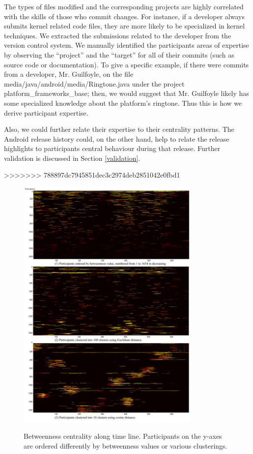 \documentclass[conference]{IEEEtran}
\begin{document}
The types of files modified and the corresponding projects are highly
correlated with the skills of those who commit changes. For
instance, if a developer always submits kernel related code
files, they are more likely to be specialized in kernel techniques. We
extracted the submissions related to the developer from the version
control system.
We manually identified the participants areas of expertise by
observing the ``project'' and the
``target'' for all of their commits (such as source code or
documentation).
To give a specific example, if there were commits from a developer,
Mr. Guilfoyle, on the file
media/java/android/media/Ringtone.java under the project
platform\_frameworks\_base; then, we would suggest that Mr. Guilfoyle 
likely has some specialized knowledge about the platform's ringtone. 
Thus this is how we derive participant expertise.

Also, we could further relate their expertise to their centrality
patterns. The Android release history could, on the other hand, help
to relate the release highlights to participants central behaviour during
that release. Further validation is discussed in Section
\ref{validation}. 

>>>>>>> 788897dc7945851dec3c2974deb2851042e0fbd1

\begin{figure}[!t]
\centerline{\includegraphics[width=3.54in]{cluster_comp.png}
\label{cluster_comp}}
\caption{Betweenness centrality along time line. Participants on the y-axes are ordered differently by betweenness values or various clusterings. }
\end{figure}
\end{document}

